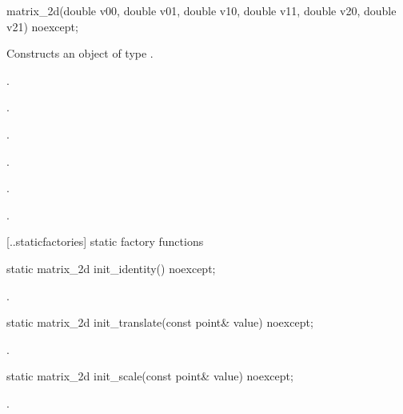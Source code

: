 \begin{itemdecl}
    matrix_2d(double v00, double v01, double v10, double v11,
      double v20, double v21) noexcept;
\end{itemdecl}
\begin{itemdescr}
	\pnum
	\effects
	Constructs an object of type .
	
	\pnum
	\postconditions
	.
	
	\pnum
	.
	
	\pnum
	.
	
	\pnum
	.
	
	\pnum
	.
	
	\pnum
	.
	
\end{itemdescr}

 [\iotwod.\matrixtwod.staticfactories] { static factory 
functions}

\begin{itemdecl}
static matrix_2d init_identity() noexcept;
\end{itemdecl}
\begin{itemdescr}
	\pnum
	\returns
	.
\end{itemdescr}

\begin{itemdecl}
static matrix_2d init_translate(const point& value) noexcept;
\end{itemdecl}
\begin{itemdescr}
	\pnum
	\returns
	.
\end{itemdescr}

\begin{itemdecl}
static matrix_2d init_scale(const point& value) noexcept;
\end{itemdecl}
\begin{itemdescr}
	\pnum
	\returns
	.
\end{itemdescr}

